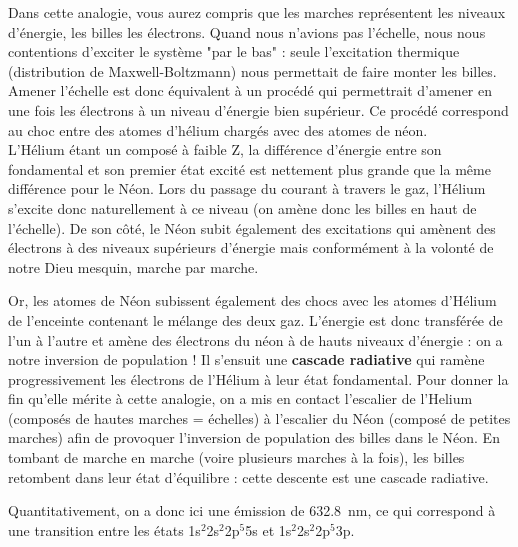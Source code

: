 Dans cette analogie, vous aurez compris que les marches représentent les niveaux d'énergie, les billes les électrons. Quand nous n'avions pas l'échelle, nous nous contentions d'exciter le système "par le bas" : seule l'excitation thermique (distribution de Maxwell-Boltzmann) nous permettait de faire monter les billes. Amener l'échelle est donc équivalent à un procédé qui permettrait d'amener en une fois les électrons à un niveau d'énergie bien supérieur. Ce procédé correspond au choc entre des atomes d'hélium chargés avec des atomes de néon.\\

L'Hélium étant un composé à faible Z, la différence d'énergie entre son fondamental et son premier état excité est nettement plus grande que la même différence pour le Néon. Lors du passage du courant à travers le gaz, l'Hélium s'excite donc naturellement à ce niveau (on amène donc les billes en haut de l'échelle). De son côté, le Néon subit également des excitations qui amènent des électrons à des niveaux supérieurs d'énergie mais conformément à la volonté de notre Dieu mesquin, marche par marche.

Or, les atomes de Néon subissent également des chocs avec les atomes d'Hélium de l'enceinte contenant le mélange des deux gaz. L'énergie est donc transférée de l'un à l'autre et amène des électrons du néon à de hauts niveaux d'énergie : on a notre inversion de population ! Il s'ensuit une \textbf{cascade radiative} qui ramène progressivement les électrons de l'Hélium à leur état fondamental. Pour donner la fin qu'elle mérite à cette analogie, on a mis en contact l'escalier de l'Helium (composés de hautes marches = échelles) à l'escalier du Néon (composé de petites marches) afin de provoquer l'inversion de population des billes dans le Néon. En tombant de marche en marche (voire plusieurs marches à la fois), les billes retombent dans leur état d'équilibre : cette descente est une cascade radiative.

Quantitativement, on a donc ici une émission de \SI{632.8}{nm}, ce qui correspond à une transition entre les états 1s$^2$2s$^2$2p$^5$5s et 1s$^2$2s$^2$2p$^5$3p.

